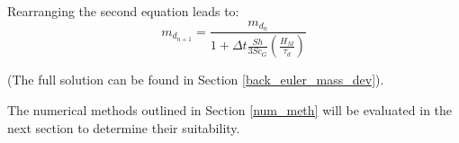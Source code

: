 \documentclass[../Interim_Report_Master]{subfiles}
\begin{document}
Rearranging the second equation leads to:
\begin{equation}
m_{d_{n+1}} = \frac{m_{d_{n}}}{1+ \Delta t\frac{Sh}{3Sc_{G}}\left(\frac{H_M}{\tau_{d}}\right)} 
\end{equation} 

(The full solution can be found in Section \ref{back_euler_mass_dev}). 


The numerical methods outlined in Section \ref{num_meth} will be evaluated in the next section to determine their suitability.

%
%
\end{document}
